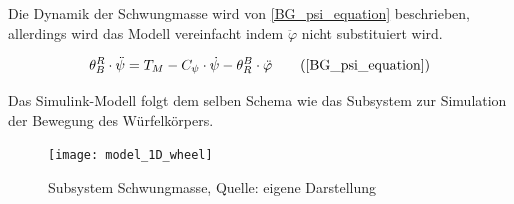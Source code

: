 Die Dynamik der Schwungmasse wird von \ref{BG_psi_equation} beschrieben, allerdings wird das Modell vereinfacht indem $\ddot{\varphi}$ nicht substituiert wird.

\begin{equation}
{\theta}^R_B \cdot \ddot{\psi} = T_M - C_{\psi} \cdot \dot{\psi} - {\theta}^B_R \cdot \ddot{\varphi}\tag{\ref{BG_psi_equation}}
\end{equation}

Das Simulink-Modell folgt dem selben Schema wie das Subsystem zur Simulation der Bewegung des Würfelkörpers.

\begin{figure}[h]
\label{Simulink_1DModell_Wheel_pic}
\texttt{[image: model\_1D\_wheel]}
\caption{Subsystem Schwungmasse, Quelle: eigene Darstellung}
\end{figure}